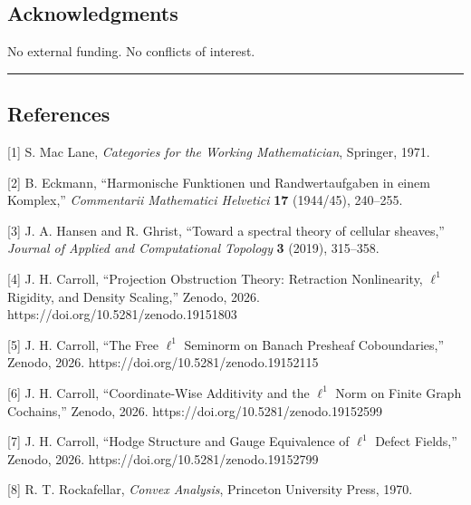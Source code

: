 \documentclass[
]{article}
\begin{document}
\subsection{Acknowledgments}\label{acknowledgments}

No external funding. No conflicts of interest.

\begin{center}\rule{0.5\linewidth}{0.5pt}\end{center}

\subsection{References}\label{references}

{[}1{]} S. Mac Lane, \emph{Categories for the Working Mathematician},
Springer, 1971.

{[}2{]} B. Eckmann, ``Harmonische Funktionen und Randwertaufgaben in
einem Komplex,'' \emph{Commentarii Mathematici Helvetici} \textbf{17}
(1944/45), 240--255.

{[}3{]} J. A. Hansen and R. Ghrist, ``Toward a spectral theory of
cellular sheaves,'' \emph{Journal of Applied and Computational Topology}
\textbf{3} (2019), 315--358.

{[}4{]} J. H. Carroll, ``Projection Obstruction Theory: Retraction
Nonlinearity, \(\ell^1\) Rigidity, and Density Scaling,'' Zenodo, 2026.
https://doi.org/10.5281/zenodo.19151803

{[}5{]} J. H. Carroll, ``The Free \(\ell^1\) Seminorm on Banach Presheaf
Coboundaries,'' Zenodo, 2026. https://doi.org/10.5281/zenodo.19152115

{[}6{]} J. H. Carroll, ``Coordinate-Wise Additivity and the \(\ell^1\)
Norm on Finite Graph Cochains,'' Zenodo, 2026.
https://doi.org/10.5281/zenodo.19152599

{[}7{]} J. H. Carroll, ``Hodge Structure and Gauge Equivalence of
\(\ell^1\) Defect Fields,'' Zenodo, 2026.
https://doi.org/10.5281/zenodo.19152799

{[}8{]} R. T. Rockafellar, \emph{Convex Analysis}, Princeton University
Press, 1970.
\end{document}
